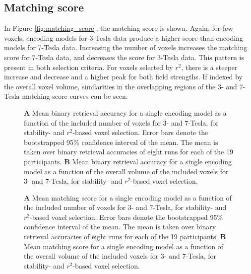\subsection*{Matching score}

In Figure \ref{fig:matching_score}, the matching score is shown. Again, for few
voxels, encoding models for 3-Tesla data produce a higher score than encoding
models for 7-Tesla data. Increasing the number of voxels increases the matching
score for 7-Tesla data, and decreases the score for 3-Tesla data. This pattern
is present in both selection criteria. For voxels selected by $r^2$, there is a
steeper increase and decrease and a higher peak for both field strengths.  If
indexed by the overall voxel volume, similarities in the overlapping regions of
the 3- and 7-Tesla matching score curves can be seen.

\begin{figure}
  \centering
  \def\svgwidth{\linewidth}
  
	
  \caption{\textbf{A} Mean binary retrieval accuracy for a single encoding
  model as a function of the included number of voxels for 3- and 7-Tesla, for
  stability- and $r^2$-based voxel selection. Error bars denote the
  bootstrapped 95\% confidence interval of the mean. The mean is taken over
  binary retrieval accuracies of eight runs for each of the 19 participants.
  \textbf{B} Mean binary retrieval accuracy for a single encoding model as a
  function of the overall volume of the included voxels for 3- and 7-Tesla, for
stability- and $r^2$-based voxel selection.
}

\label{fig:binary_retrieval_mve}
\end{figure}

\begin{figure}
  \centering
  \def\svgwidth{\linewidth}
  
	
  \caption{\textbf{A} Mean matching score for a single encoding model as a
  function of the included number of voxels for 3- and 7-Tesla, for stability-
  and $r^2$-based voxel selection. Error bars denote the bootstrapped 95\%
  confidence interval of the mean. The mean is taken over binary retrieval
  accuracies of eight runs for each of the 19 participants. \textbf{B} Mean
matching score for a single encoding model as a function of the overall volume
of the included voxels for 3- and 7-Tesla, for stability- and $r^2$-based voxel
selection.
}

 \label{fig:matching_score_mve}
\end{figure}


